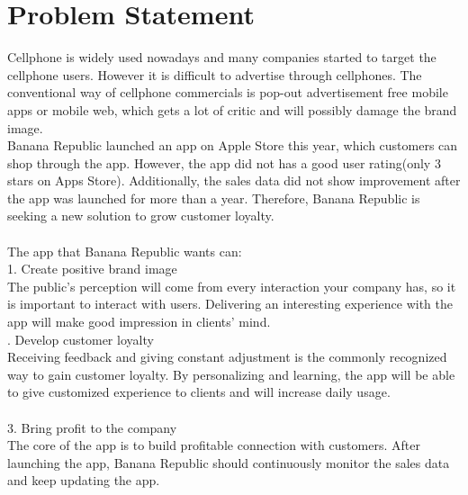 \documentclass[12pt,letterpaper]{article}
\theoremstyle{definition}
\begin{document}
\section{Problem Statement}
Cellphone is widely used nowadays and many companies started to target the cellphone users. However it is difficult to advertise through cellphones. The conventional way of cellphone commercials is pop-out advertisement free mobile apps or mobile web, which gets a lot of critic and will possibly damage the brand image.
\\ 
Banana Republic launched an app on Apple Store this year, which customers can shop through the app. However, the app did not has a good user rating(only 3 stars on Apps Store). Additionally, the sales data did not show improvement after the app was launched for more than a year. Therefore, Banana Republic is seeking a new solution to grow customer loyalty.
\\\\
The app that Banana Republic wants can:
\\
1. Create positive brand image
\\
The public's perception will come from every interaction your company has, so it is important to interact with users. Delivering an interesting experience with the app will make good impression in clients’ mind.
\\
\newpage
{}. Develop customer loyalty
\\
Receiving feedback and giving constant adjustment is the commonly recognized way to gain customer loyalty. By personalizing and learning, the app will be able to give customized experience to clients and will increase daily usage.
\\
\\
3. Bring profit to the company
\\
The core of the app is to build profitable connection with customers. After launching the app, Banana Republic should continuously monitor the sales data and keep updating the app.
\end{document}
